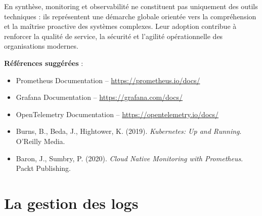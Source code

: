 En synthèse, monitoring et observabilité ne constituent pas uniquement des outils techniques : ils représentent une démarche globale orientée vers la compréhension et la maîtrise proactive des systèmes complexes. Leur adoption contribue à renforcer la qualité de service, la sécurité et l’agilité opérationnelle des organisations modernes.

\textbf{Références suggérées} :
\begin{itemize}
	\item Prometheus Documentation – \url{https://prometheus.io/docs/}
	\item Grafana Documentation – \url{https://grafana.com/docs/}
	\item OpenTelemetry Documentation – \url{https://opentelemetry.io/docs/}
	\item Burns, B., Beda, J., Hightower, K. (2019). \textit{Kubernetes: Up and Running}. O’Reilly Media.
	\item Baron, J., Sumbry, P. (2020). \textit{Cloud Native Monitoring with Prometheus}. Packt Publishing.
\end{itemize}

\section{La gestion des logs}

